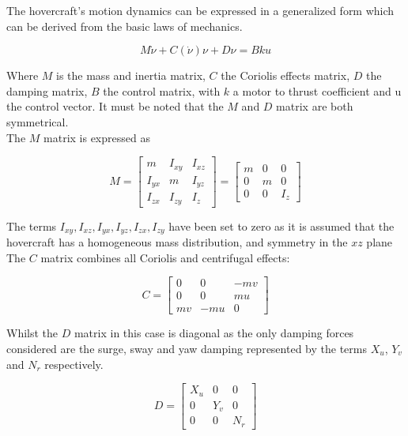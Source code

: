 \documentclass[a4paper,12pt]{article}
\begin{document}
The hovercraft’s motion dynamics can be expressed in a generalized form which can be derived from the basic laws of mechanics.

\begin{equation}
    M\dot{\nu} + C(\dot{\nu})\nu + D\nu = Bku
\end{equation}

Where \(M\) is the mass and inertia matrix, \(C\) the Coriolis effects matrix, \(D\) the damping matrix, \(B\) the control matrix, with \(k\) a motor to thrust coefficient and u the control vector. It must be noted that the \(M\) and \(D\) matrix are both symmetrical.\\

The \(M\) matrix is expressed as

\begin{equation}
    M =
    \begin{bmatrix}
        m    & I_{xy} & I_{xz}\\
        I_{yx} &   m  & I_{yz}\\
        I_{zx} & I_{zy} & I_z
    \end{bmatrix}
    =
    \begin{bmatrix}
        m & 0 & 0\\
        0 & m & 0\\
        0 & 0 & I_z
    \end{bmatrix}
\end{equation}

The terms \(I_{xy},I_{xz},I_{yx},I_{yz},I_{zx},I_{zy}\) have been set to zero as it is assumed that the hovercraft has a homogeneous mass distribution, and symmetry in the \(xz\) plane\\

The \(C\) matrix combines all Coriolis and centrifugal effects:

\begin{equation}
    C =
    \begin{bmatrix}
    0  & 0   & -mv\\
    0  & 0   &  mu\\
    mv & -mu & 0
    \end{bmatrix}
\end{equation}

Whilst the \(D\) matrix in this case is diagonal as the only damping forces considered are the surge, sway and yaw damping represented by the terms \(X_u\), \(Y_v\) and \(N_r\) respectively.

\begin{equation}
    D =
    \begin{bmatrix}
        X_u &  0  & 0\\
        0   & Y_v & 0\\
        0   &  0  & N_r
    \end{bmatrix}
\end{equation}
\end{document}
